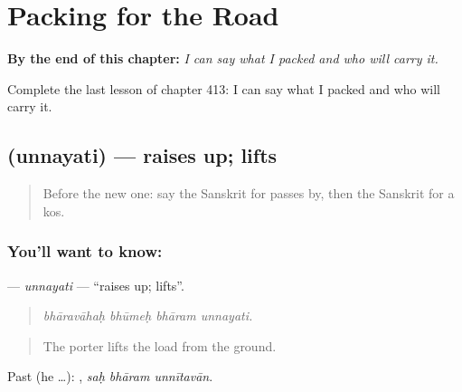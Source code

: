 
\chapter{Packing for the Road}
\label{ch:sa-packing-for-the-road}

\begin{chapteropening}
\textbf{By the end of this chapter:} \emph{I can say what I packed and who will carry it.}

Complete the last lesson of chapter 413: I can say what I packed and who will carry it.
\end{chapteropening}

\section[\texorpdfstring{\sk{उन्नयति} (unnayati)}{उन्नयति (unnayati)}]{ (unnayati) — raises up; lifts}

\label{lesson:SA-C413-unnayati}



\begin{quote}
Before the new one: say the Sanskrit for passes by, then the Sanskrit for a kos.
\end{quote}

\subsection*{You'll want to know: }
\textbf{} — \emph{unnayati} — \textquotedblleft{}raises up; lifts\textquotedblright{}.

\begin{quote}
   
\end{quote}

\begin{quote}
\emph{bhāravāhaḥ bhūmeḥ bhāram unnayati.}
\end{quote}

\begin{quote}
The porter lifts the load from the ground.
\end{quote}

Past (he …):   , \emph{saḥ bhāram unnītavān}.

